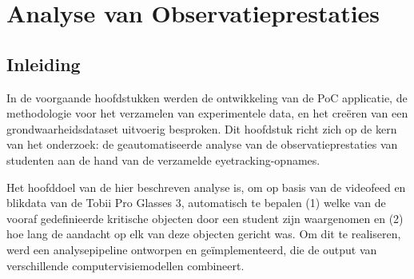 \chapter{Analyse van Observatieprestaties}
\label{ch:analyse}

\section{Inleiding}

In de voorgaande hoofdstukken werden de ontwikkeling van de PoC applicatie, de methodologie voor het verzamelen 
van experimentele data, en het creëren van een grondwaarheidsdataset uitvoerig besproken. 
Dit hoofdstuk richt zich op de kern van het onderzoek: de geautomatiseerde analyse van de 
observatieprestaties van studenten aan de hand van de verzamelde eyetracking-opnames.

Het hoofddoel van de hier beschreven analyse is, om op basis van de videofeed en blikdata van de Tobii Pro Glasses 3, 
automatisch te bepalen (1) welke van de vooraf gedefinieerde kritische objecten door een student zijn waargenomen en (2) 
hoe lang de aandacht op elk van deze objecten gericht was. 
Om dit te realiseren, werd een analysepipeline ontworpen en geïmplementeerd, die de output van verschillende computervisiemodellen combineert.

